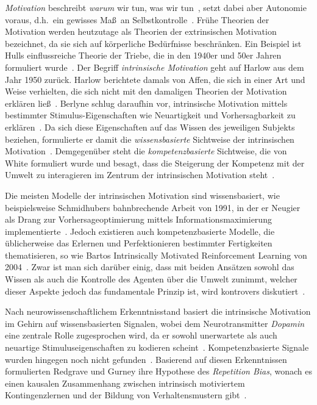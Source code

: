 \documentclass[a4paper]{scrreprt}
\begin{document}
\textit{Motivation} beschreibt \textit{warum} wir tun, was wir tun~\cite{ryan00b}, setzt dabei aber Autonomie voraus, d.h.~ein gewisses Ma\ss ~an Selbstkontrolle~\cite{mcfarland93}. Fr\"uhe Theorien der Motivation werden heutzutage als Theorien der extrinsischen Motivation bezeichnet, da sie sich auf k\"orperliche Bed\"urfnisse beschr\"anken. Ein Beispiel ist Hulls einflussreiche Theorie der Triebe, die in den 1940er und 50er Jahren formuliert wurde~\cite{hull43,hull51,hull52}. Der Begriff \textit{intrinsische Motivation} geht auf Harlow aus dem Jahr 1950 zur\"uck. Harlow berichtete damals von Affen, die sich in einer Art und Weise verhielten, die sich nicht mit den damaligen Theorien der Motivation erkl\"aren lie\ss~\cite{harlow50}. Berlyne schlug daraufhin vor, intrinsische Motivation mittels bestimmter Stimulus-Eigenschaften wie Neuartigkeit und Vorhersagbarkeit zu erkl\"aren~\cite{berlyne54,berlyne60,berlyne71}. Da sich diese Eigenschaften auf das Wissen des jeweiligen Subjekts beziehen, formulierte er damit die \textit{wissensbasierte} Sichtweise der intrinsischen Motivation~\cite{oudeyer07}. Demgegen\"uber steht die \textit{kompetenzbasierte} Sichtweise, die von White formuliert wurde und besagt, dass die Steigerung der Kompetenz mit der Umwelt zu interagieren im Zentrum der intrinsischen Motivation steht~\cite{white59}.

Die meisten Modelle der intrinsischen Motivation sind wissensbasiert, wie beispielsweise Schmidhubers bahnbrechende Arbeit von 1991, in der er Neugier als Drang zur Vorhersageoptimierung mittels Informationsmaximierung implementierte~\cite{schmidhuber91}. Jedoch existieren auch kompetenzbasierte Modelle, die \"ublicherweise das Erlernen und Perfektionieren bestimmter Fertigkeiten thematisieren, so wie Bartos Intrinsically Motivated Reinforcement Learning von 2004~\cite{barto04,singh05}. Zwar ist man sich dar\"uber einig, dass mit beiden Ans\"atzen sowohl das Wissen als auch die Kontrolle des Agenten \"uber die Umwelt zunimmt, welcher dieser Aspekte jedoch das fundamentale Prinzip ist, wird kontrovers diskutiert~\cite{mirolli13,barto13,schmidhuber09}.

Nach neurowissenschaftlichem Erkenntnisstand basiert die intrinsische Motivation im Gehirn auf wissensbasierten Signalen, wobei dem Neurotransmitter \textit{Dopamin} eine zentrale Rolle zugesprochen wird, da er sowohl unerwartete als auch neuartige Stimuluseigenschaften zu kodieren scheint~\cite{dommett05,horvitz00,lisman05,otmakova12}. Kompetenzbasierte Signale wurden hingegen noch nicht gefunden~\cite{mirolli13}. Basierend auf diesen Erkenntnissen formulierten Redgrave und Gurney ihre Hypothese des \textit{Repetition Bias}, wonach es einen kausalen Zusammenhang zwischen intrinsisch motiviertem Kontingenzlernen und der Bildung von Verhaltensmustern gibt~\cite{redgrave06,gurney12,redgrave12}.
\end{document}
